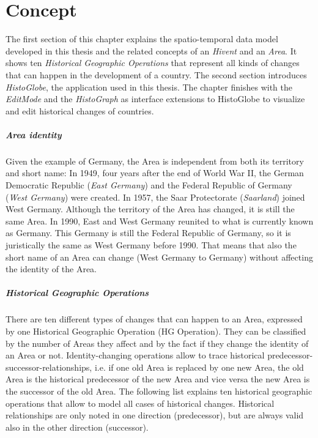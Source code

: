 
\chapter{Concept} %
\label{cha:concept}

The first section of this chapter explains the spatio-temporal data model developed in this thesis and the related concepts of an  \emph{Hivent} and an \emph{Area}. It shows ten \emph{Historical Geographic Operations} that represent all kinds of changes that can happen in the development of a country. The second section introduces \emph{HistoGlobe}, the application used in this thesis. The chapter finishes with the \emph{EditMode} and the \emph{HistoGraph} as interface extensions to HistoGlobe to visualize and edit historical changes of countries.

\paragraph{Area identity} %
\label{par:area_identity}

Given the example of Germany, the Area is independent from both its territory and short name: In 1949, four years after the end of World War II, the German Democratic Republic (\emph{East Germany}) and the Federal Republic of Germany (\emph{West Germany}) were created. In 1957, the Saar Protectorate (\emph{Saarland}) joined West Germany. Although the territory of the Area has changed, it is still the same Area. In 1990, East and West Germany reunited to what is currently known as Germany. This Germany is still the Federal Republic of Germany, so it is juristically the same as West Germany before 1990. That means that also the short name of an Area can change (West Germany to Germany) without affecting the identity of the Area.



\paragraph{Historical Geographic Operations} %
\label{par:historical_geographic_operations}

There are ten different types of changes that can happen to an Area, expressed by one Historical Geographic Operation (HG Operation). They can be classified by the number of Areas they affect and by the fact if they change the identity of an Area or not. Identity-changing operations allow to trace historical predecessor-successor-relationships, i.e. if one old Area is replaced by one new Area, the old Area is the historical predecessor of the new Area and vice versa the new Area is the successor of the old Area. The following list explains ten historical geographic operations that allow to model all cases of historical changes. Historical relationships are only noted in one direction (predecessor), but are always valid also in the other direction (successor).

